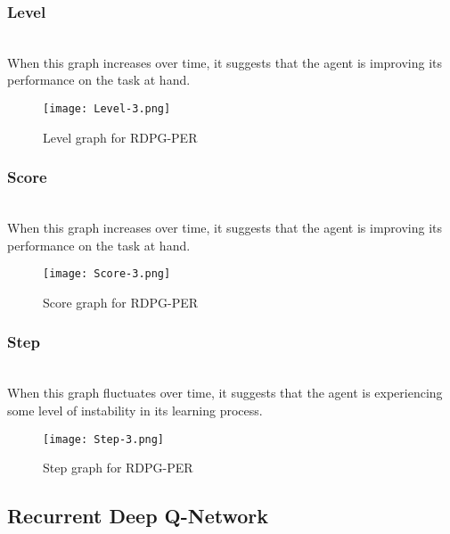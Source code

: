 \documentclass[preprint,12pt]{elsarticle}
\begin{document}
\subsubsection{Level}\\
When this graph increases over time, it suggests that the agent is improving its performance on the task at hand.
\graphicspath{ {./images/} }
\begin{figure}[!htbp]
  \centering
  \texttt{[image: Level-3.png]}
  \caption{Level graph for RDPG-PER}
  \label{fig:level}
\end{figure}


\subsubsection{Score}\\
When this graph increases over time, it suggests that the agent is improving its performance on the task at hand.
\graphicspath{ {./images/} }
\begin{figure}[!htbp]
  \centering
  \texttt{[image: Score-3.png]}
  \caption{Score graph for RDPG-PER}
  \label{fig:score}
\end{figure}


\subsubsection{Step}\\
When this graph fluctuates over time, it suggests that the agent is experiencing some level of instability in its learning process.
\graphicspath{ {./images/} }
\begin{figure}[!htbp]
  \centering
  \texttt{[image: Step-3.png]}
  \caption{Step graph for RDPG-PER}
  \label{fig:step}
\end{figure}


\subsection{Recurrent Deep Q-Network}\\
\end{document}
